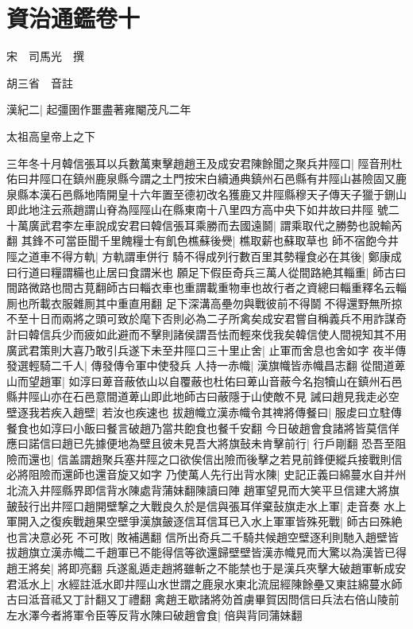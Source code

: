 \section{資治通鑑卷十}
宋　司馬光　撰

胡三省　音註

漢紀二|{
	起彊圉作噩盡著雍閹茂凡二年}


太祖高皇帝上之下

三年冬十月韓信張耳以兵數萬東擊趙趙王及成安君陳餘聞之聚兵井陘口|{
	陘音刑杜佑曰井陘口在鎮州鹿泉縣今謂之土門按宋白續通典鎮州石邑縣有井陘山甚險固又鹿泉縣本漢石邑縣地隋開皇十六年置至德初改名獲鹿又井陘縣穆天子傳天子獵于鉶山即此地注云燕趙謂山脊為陘陘山在縣東南十八里四方高中央下如井故曰井陘}
號二十萬廣武君李左車說成安君曰韓信張耳乘勝而去國遠鬬|{
	謂乘取代之勝勢也說輸芮翻}
其鋒不可當臣聞千里餽糧士有飢色樵蘇後㸑|{
	樵取薪也蘇取草也}
師不宿飽今井陘之道車不得方軌|{
	方軌謂車併行}
騎不得成列行數百里其勢糧食必在其後|{
	鄭康成曰行道曰糧謂糒也止居曰食謂米也}
願足下假臣奇兵三萬人從間路絶其輜重|{
	師古曰間路微路也間古莧翻師古曰輜衣車也重謂載重物車也故行者之資總曰輜重釋名云輜厠也所載衣服雜厠其中重直用翻}
足下深溝高壘勿與戰彼前不得鬬不得還野無所掠不至十日而兩將之頭可致於麾下否則必為二子所禽矣成安君嘗自稱義兵不用詐謀奇計曰韓信兵少而疲如此避而不擊則諸侯謂吾怯而輕來伐我矣韓信使人間視知其不用廣武君策則大喜乃敢引兵遂下未至井陘口三十里止舍|{
	止軍而舍息也舍如字}
夜半傳發選輕騎二千人|{
	傳發傳令軍中使發兵}
人持一赤幟|{
	漢旗幟皆赤幟昌志翻}
從間道萆山而望趙軍|{
	如淳曰萆音蔽依山以自覆蔽也杜佑曰萆山音蔽今名抱犢山在鎮州石邑縣井陘山亦在石邑意間道萆山即此地師古曰蔽隱于山使敵不見}
誡曰趙見我走必空壁逐我若疾入趙壁|{
	若汝也疾速也}
拔趙幟立漢赤幟令其禆將傳餐曰|{
	服䖍曰立駐傳餐食也如淳曰小飯曰餐言破趙乃當共飽食也餐千安翻}
今日破趙會食諸將皆莫信佯應曰諾信曰趙已先據便地為壁且彼未見吾大將旗鼔未肯擊前行|{
	行戶剛翻}
恐吾至阻險而還也|{
	信盖謂趙聚兵塞井陘之口欲俟信出險而後擊之若見前鋒便縱兵接戰則信必將阻險而還師也還音旋又如字}
乃使萬人先行出背水陳|{
	史記正義曰綿蔓水自并州北流入井陘縣界即信背水陳處背蒲妹翻陳讀曰陣}
趙軍望見而大笑平旦信建大將旗皷鼔行出井陘口趙開壁撃之大戰良久於是信與張耳佯棄鼔旗走水上軍|{
	走音奏}
水上軍開入之復疾戰趙果空壁爭漢旗皷逐信耳信耳已入水上軍軍皆殊死戰|{
	師古曰殊絶也言决意必死}
不可敗|{
	敗補邁翻}
信所出奇兵二千騎共候趙空壁逐利則馳入趙壁皆拔趙旗立漢赤幟二千趙軍已不能得信等欲還歸壁壁皆漢赤幟見而大驚以為漢皆已得趙王將矣|{
	將即亮翻}
兵遂亂遁走趙將雖斬之不能禁也于是漢兵夾擊大破趙軍斬成安君泜水上|{
	水經註泜水即井陘山水世謂之鹿泉水東北流屈經陳餘壘又東註綿蔓水師古曰泜音祗又丁計翻又丁禮翻}
禽趙王歇諸將効首虜畢賀因問信曰兵法右倍山陵前左水澤今者將軍令臣等反背水陳曰破趙會食|{
	倍與背同蒲妹翻}
